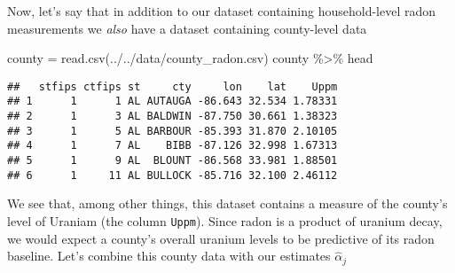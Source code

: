 \documentclass[
]{article}
\newenvironment{Shaded}{\begin{snugshade}}{\end{snugshade}}
\newcommand{\AttributeTok}[1]{\textcolor[rgb]{0.77,0.63,0.00}{#1}}
\newcommand{\FunctionTok}[1]{\textcolor[rgb]{0.00,0.00,0.00}{#1}}
\newcommand{\NormalTok}[1]{#1}
\newcommand{\OtherTok}[1]{\textcolor[rgb]{0.56,0.35,0.01}{#1}}
\newcommand{\SpecialCharTok}[1]{\textcolor[rgb]{0.00,0.00,0.00}{#1}}
\newcommand{\StringTok}[1]{\textcolor[rgb]{0.31,0.60,0.02}{#1}}
\begin{document}
Now, let's say that in addition to our dataset containing
household-level radon measurements we \emph{also} have a dataset
containing county-level data

\begin{Shaded}
\begin{Highlighting}[]
\NormalTok{county }\OtherTok{=} \FunctionTok{read.csv}\NormalTok{(}\StringTok{\textquotesingle{}../../data/county\_radon.csv\textquotesingle{}}\NormalTok{)}
\NormalTok{county }\SpecialCharTok{\%\textgreater{}\%}\NormalTok{ head}
\end{Highlighting}
\end{Shaded}

\begin{verbatim}
##   stfips ctfips st     cty     lon    lat    Uppm
## 1      1      1 AL AUTAUGA -86.643 32.534 1.78331
## 2      1      3 AL BALDWIN -87.750 30.661 1.38323
## 3      1      5 AL BARBOUR -85.393 31.870 2.10105
## 4      1      7 AL    BIBB -87.126 32.998 1.67313
## 5      1      9 AL  BLOUNT -86.568 33.981 1.88501
## 6      1     11 AL BULLOCK -85.716 32.100 2.46112
\end{verbatim}

We see that, among other things, this dataset contains a measure of the
county's level of Uraniam (the column \texttt{Uppm}). Since radon is a
product of uranium decay, we would expect a county's overall uranium
levels to be predictive of its radon baseline. Let's combine this county
data with our estimates \(\hat \alpha_j\)

\begin{Shaded}
\end{Shaded}
\end{document}
